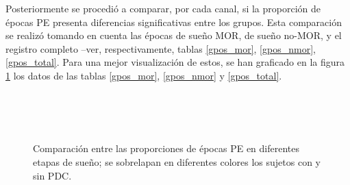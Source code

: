 Posteriormente se procedi\'o a comparar, por cada canal, si la proporci\'on de \'epocas PE
presenta diferencias significativas entre los grupos. Esta comparaci\'on se realiz\'o tomando
en cuenta las \'epocas de sue\~no MOR, de sue\~no no-MOR, y el registro completo 
--ver, respectivamente, tablas \ref{gpos_mor}, \ref{gpos_nmor}, \ref{gpos_total}.
Para una mejor visualizaci\'on de estos, se han graficado
en la figura \ref{comparacion_graf}
los datos de las tablas \ref{gpos_mor}, \ref{gpos_nmor} y
\ref{gpos_total}.

\begin{figure}
\centering
{}\\
\\
\\
\caption{Comparaci\'on entre las proporciones de \'epocas PE en diferentes
etapas de sue\~no; 
se sobrelapan en diferentes colores los sujetos con y sin PDC.}
\label{comparacion_graf}
\end{figure}

